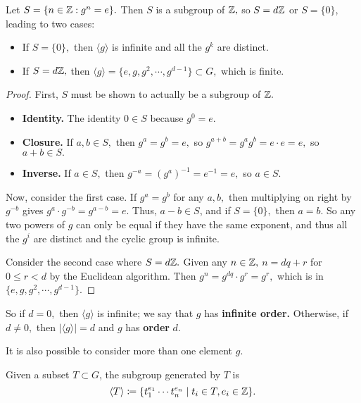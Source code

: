 \begin{theorem}
Let $S = \{n \in \mathbb Z: g^n = e\}.$ Then $S$ is a subgroup of $\mathbb Z,$ so $S = d\mathbb Z$ or $S = \{0\}$, leading to two cases:
\begin{itemize}
    \item If $S = \{0\},$ then $\langle g \rangle$ is infinite and all the $g^k$ are distinct.
    \item If $S = d\mathbb Z,$ then $\langle g \rangle = \{e, g, g^2, \cdots, g^{d-1}\} \subset G,$ which is finite.
\end{itemize}
\end{theorem}
\begin{proof}
First, $S$ must be shown to actually be a subgroup of $\mathbb Z.$
\begin{itemize}
    \item \textbf{Identity.} The identity $0 \in S$ because $g^0 = e.$
    \item \textbf{Closure.} If $a, b \in S,$ then $g^a = g^b = e,$ so $g^{a + b} = g^ag^b = e \cdot e = e,$ so $a + b \in S.$
    \item \textbf{Inverse.} If $a \in S,$ then $g^{-a} = (g^a)^{-1} = e^{-1} = e,$ so $a \in S.$
    
\end{itemize}

Now, consider the first case. If $g^a = g^b$ for any $a, b,$ then multiplying on right by $g^{-b}$ gives $g^a\cdot g^{-b} = g^{a-b} = e.$ Thus, $a - b \in S$, and if $S = \{0\},$ then $a = b.$ So any two powers of $g$ can only be equal if they have the same exponent, and thus all the $g^i$ are distinct and the cyclic group is infinite. 

Consider the second case where $S = d\mathbb Z.$ Given any $n \in \mathbb Z,$ $n = dq + r$ for $0 \leq r < d$ by the Euclidean algorithm. Then $g^n = g^{dq} \cdot g^r = g^r,$ which is in $\{e, g, g^2, \cdots, g^{d-1}\}.$
\end{proof}

\begin{definition}
So if $d = 0,$ then $\langle g \rangle$ is infinite; we say that $g$ has \textbf{infinite order.} Otherwise, if $d \neq 0,$ then $|\langle g \rangle| = d$ and $g$ has \textbf{order} $d$.
\end{definition}

It is also possible to consider more than one element $g.$ 
\begin{definition}
Given a subset $T \subset G$, the subgroup generated by $T$ is \[\langle T \rangle \coloneqq \{t_1^{e_1}\cdots t_n^{e_n} \mid t_i \in T, e_i \in \mathbb Z\}.\] 
\end{definition}


